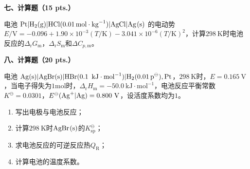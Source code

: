 \vspace{0.5cm}
\noindent\textbf{七、计算题（15 pts.）}

电池 $\ce{Pt|H2(g)|HCl(0.01mol\cdot kg^{-1})|AgCl|Ag(s)}$ 的电动势$E/\mathrm{V}=-0.096+1.90\times10^{-3}(T/\mathrm{K})-3.041\times10^{-6}(T/\mathrm{K})^2$，计算$298\ \mathrm{K}$时电池反应的$\Delta_\mathrm{r}G_\mathrm{m}$，$\Delta_\mathrm{r}S_\mathrm{m}$和$\Delta C_{p,\mathrm{m}}$。

\vspace{0.5cm}
\noindent\textbf{八、计算题（20 pts.）}

电池 $\ce{Ag(s)|AgBr(s)|HBr(0.1\ kJ\cdot mol^{-1})|H2(0.01p^\ominus),Pt}$，$298\ \mathrm{K}$时，$E=0.165\ \mathrm{V}$，当电子得失为$1\mathrm{mol}$时，$\Delta_\mathrm{r}H_\mathrm{m}=-50.0\ \mathrm{kJ\cdot mol^{-1}}$，电池反应平衡常数$K^\ominus=0.0301$，$E^\ominus(\ce{Ag+|Ag})=0.800\ \mathrm{V}$，设活度系数均为$1$。
\begin{enumerate}[label=(\arabic*), itemsep=1ex]
    \item 写出电极与电池反应；
    \item 计算$298\ \mathrm{K}$时$\ce{AgBr(s)}$的$K_{\mathrm{sp}}^\ominus$；
    \item 求电池反应的可逆反应热$Q_\mathrm{R}$；
    \item 计算电池的温度系数。
\end{enumerate}